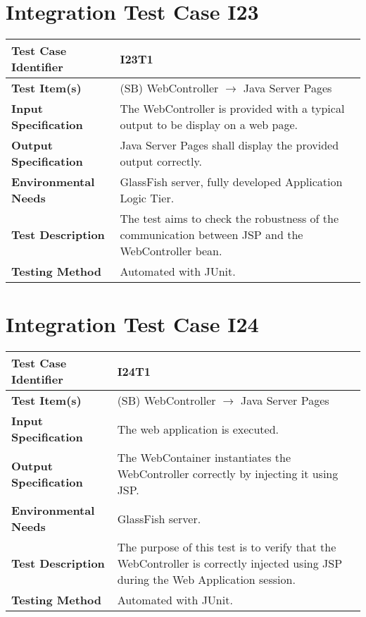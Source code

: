 \section{Integration Test Case I23}

\begin{longtable}{p{} | p{}}
\hline
\textbf{Test Case Identifier} & I23T1\\
\hline
\textbf{Test Item(s)} & (SB) WebController $\rightarrow$ Java Server Pages \\
\hline
\textbf{Input Specification} & The WebController is provided with a typical output to be display on a web page. \\
\hline
\textbf{Output Specification} & Java Server Pages shall display the provided output correctly. \\
\hline
\textbf{Environmental Needs} & GlassFish server, fully developed Application Logic Tier. \\
\hline
\textbf{Test Description} & The test aims to check the robustness of the communication between JSP and the WebController bean. \\
\hline
\textbf{Testing Method} & Automated with JUnit. \\
\hline
\end{longtable}

\section{Integration Test Case I24}

\begin{longtable}{p{} | p{}}
\hline
\textbf{Test Case Identifier} & I24T1\\
\hline
\textbf{Test Item(s)} & (SB) WebController $\rightarrow$ Java Server Pages \\
\hline
\textbf{Input Specification} & The web application is executed. \\
\hline
\textbf{Output Specification} & The WebContainer instantiates the WebController correctly by injecting it using JSP. \\
\hline
\textbf{Environmental Needs} & GlassFish server. \\
\hline
\textbf{Test Description} & The purpose of this test is to verify that the WebController is correctly injected using JSP during the Web Application session. \\
\hline
\textbf{Testing Method} & Automated with JUnit. \\
\hline
\end{longtable}